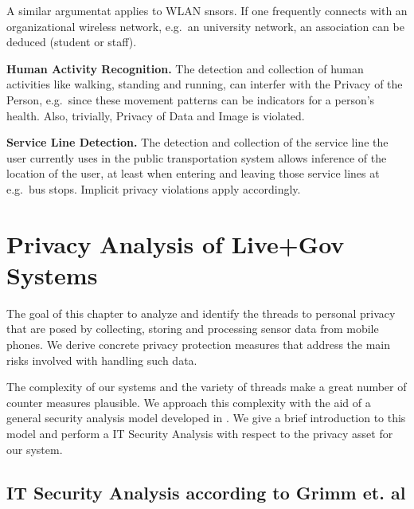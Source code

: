 A similar argumentat applies to WLAN snsors. If one frequently connects with an organizational wireless network, e.g.~an university network, an association can be deduced (student or staff).

\textbf{Human Activity Recognition.}
The detection and collection of human activities like walking, standing and running, can interfer with the Privacy of the Person, e.g.~since these movement patterns can be indicators for a person's health. Also, trivially, Privacy of Data and Image is violated.

\textbf{Service Line Detection.}
The detection and collection of the service line the user currently uses in the public transportation system allows inference of the location of the user, at least when entering and leaving those service lines at e.g.~bus stops.
Implicit privacy violations apply accordingly.



\pagebreak

\chapter{Privacy Analysis of Live+Gov Systems}

The goal of this chapter to analyze and identify the threads to personal privacy that are posed by collecting, storing and processing sensor data from mobile phones.
We derive concrete privacy protection measures that address the main risks involved with handling such data.

The complexity of our systems and the variety of threads make a great number of counter measures plausible.
We approach this complexity with the aid of a general security analysis model developed in \cite{Grimm:ItSecRefModel}.
We give a brief introduction to this model and perform a IT Security Analysis with respect to the privacy asset for our system.

\section{IT Security Analysis according to Grimm et. al}\label{sec:GrimmModel}

